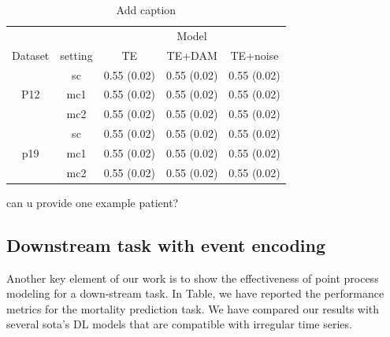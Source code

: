 \documentclass[journal,twoside,web]{ieeecolor}
\begin{document}
\begin{table}[h!]
    \centering
    \caption{Add caption}
      \begin{tabular}{ccccc}
      \toprule
            &       & \multicolumn{3}{c}{Model} \\
  \cmidrule{3-5}    Dataset & setting & TE    & TE+DAM & TE+noise \\
      \midrule
      \multirow{3}[2]{*}{P12} & sc    & 0.55 (0.02) & 0.55 (0.02) & 0.55 (0.02) \\
            & mc1   & 0.55 (0.02) & 0.55 (0.02) & 0.55 (0.02) \\
            & mc2   & 0.55 (0.02) & 0.55 (0.02) & 0.55 (0.02) \\
      \midrule
      \multirow{3}[2]{*}{p19} & sc    & 0.55 (0.02) & 0.55 (0.02) & 0.55 (0.02) \\
            & mc1   & 0.55 (0.02) & 0.55 (0.02) & 0.55 (0.02) \\
            & mc2   & 0.55 (0.02) & 0.55 (0.02) & 0.55 (0.02) \\
      \bottomrule
      \end{tabular}%
    \label{tab:addlabel}%
  \end{table}%
  




can u provide one example patient?

\subsection{Downstream task with event encoding}

Another key element of our work is to show the effectiveness of point process modeling for a down-stream task. In Table, we have reported the performance metrics for the mortality prediction task. We have compared our results with several sota's DL models that are compatible with irregular time series.
\end{document}
